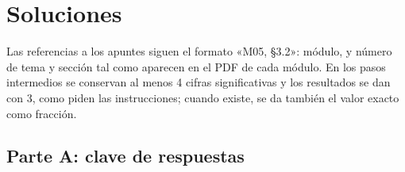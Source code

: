 \chapter{Soluciones}
\label{ap:soluciones}

Las referencias a los apuntes siguen el formato «M05, §3.2»: módulo, y número de tema y sección tal como aparecen en el PDF de cada módulo. En los pasos intermedios se conservan al menos 4 cifras significativas y los resultados se dan con 3, como piden las instrucciones; cuando existe, se da también el valor exacto como fracción.

\section{Parte A: clave de respuestas}

